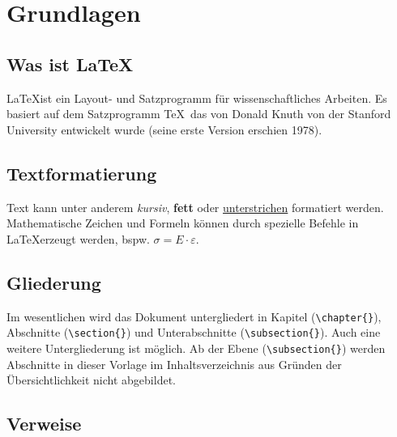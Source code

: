 \chapter{Grundlagen}
\label{ch:01_grundlagen}

\section{Was ist \LaTeX}
\label{sec:01_was_ist_latex}

\LaTeX ist ein Layout- und Satzprogramm für wissenschaftliches Arbeiten. Es basiert auf dem Satzprogramm \TeX\, das von Donald Knuth von der Stanford University entwickelt wurde (seine erste Version erschien 1978).

\section{Textformatierung}
\label{sec:01_textformatierung}

Text kann unter anderem \textit{kursiv}, \textbf{fett} oder \underline{unterstrichen} formatiert werden. Mathematische Zeichen und Formeln können durch spezielle Befehle in \LaTeX erzeugt werden, bspw. $\sigma=E\cdot\varepsilon$.

\section{Gliederung}
\label{sec:01_gliederung}

Im wesentlichen wird das Dokument untergliedert in Kapitel (\verb!\chapter{}!), Abschnitte (\verb!\section{}!) und Unterabschnitte (\verb!\subsection{}!). Auch eine weitere Untergliederung ist möglich. Ab der Ebene (\verb!\subsection{}!) werden Abschnitte in dieser Vorlage im Inhaltsverzeichnis aus Gründen der Übersichtlichkeit nicht abgebildet.

\section{Verweise}
\label{sec:01_verweise}

